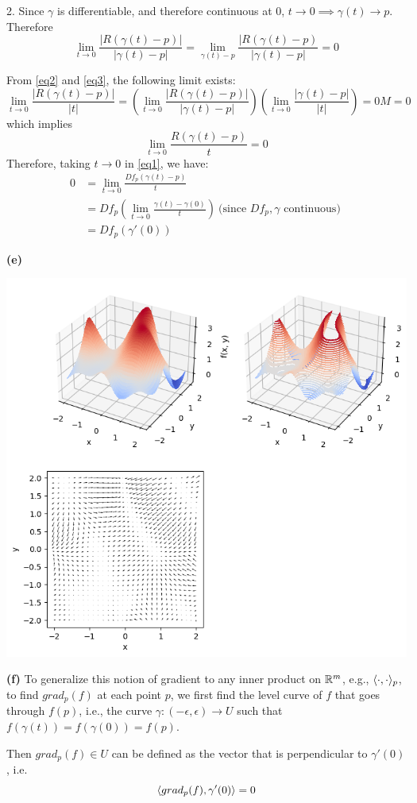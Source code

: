 \documentclass[a4paper, 12pt]{article}
\begin{document}
\begin{solution}
    2. Since $\gamma$ is differentiable, and therefore continuous at 0, $t \to 0 \implies \gamma(t) \to p$. Therefore \begin{equation} \label{eq3}
        \lim_{t \to 0} \frac{|R(\gamma(t) - p)|}{|\gamma(t) - p|} = \lim_{\gamma(t) - p} \frac{|R(\gamma(t) - p)}{|\gamma(t) - p|} = 0
    \end{equation}

    From \eqref{eq2} and \eqref{eq3}, the following limit exists: \[
        \lim_{t \to 0}\frac{|R(\gamma(t) - p)|}{|t|} = \left(\lim_{t \to 0} \frac{|R(\gamma(t) - p)|}{|\gamma(t) - p|}\right) \left( \lim_{t \to 0}\frac{|\gamma(t) - p|}{|t|}\right) = 0M = 0
    \]
    which implies \[
        \lim_{t \to 0}\frac{R(\gamma(t) - p)}{t} = 0
    \]
    Therefore, taking $t \to 0$ in \eqref{eq1}, we have:
    \begin{align*}
        0 & = \lim_{t \to 0} \frac{Df_p(\gamma(t) - p)}{t}                                                                 \\
          & = Df_p\left(\lim_{t \to 0} \frac{\gamma(t) - \gamma(0)}{t}\right) \:\text{(since $Df_p, \gamma$ continuous)}\: \\
          & = Df_p(\gamma'(0))
    \end{align*}

    \textbf{(e)}
    \begin{center}
        \includegraphics[width = 15cm]{./figures/6.9e.png}
    \end{center}

    \textbf{(f)} To generalize this notion of gradient to any inner product on $\mathbb{R}^m$, e.g., $\langle \cdot, \cdot \rangle_p$, to find $grad_p(f)$ at each point $p$, we first find the level curve of $f$ that goes through $f(p)$, i.e., the curve $\gamma: (-\epsilon , \epsilon) \to U$ such that $f(\gamma(t)) = f(\gamma(0)) = f(p)$.

    Then $grad_p(f) \in U$ can be defined as the vector that is perpendicular to $\gamma'(0)$, i.e. \[
        \langle grad_p(f), \gamma'(0) \rangle = 0
    \]
\end{solution}
\end{document}

